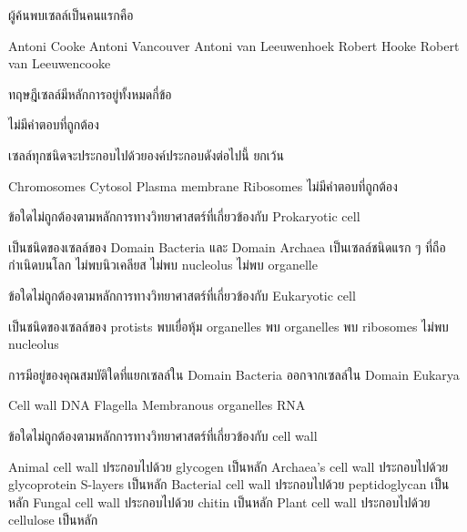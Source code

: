 \begin{questions}
\filbreak
  \question ผู้ค้นพบเซลล์เป็นคนแรกคือ
  \begin{choices}
    \choice Antoni Cooke
    \choice Antoni Vancouver
    \choice Antoni van Leeuwenhoek
    \choice Robert Hooke
    \choice Robert van Leeuwencooke
\end{choices}

\filbreak
  \question ทฤษฎีเซลล์มีหลักการอยู่ทั้งหมดกี่ข้อ
  \begin{choices}
    \choice ไม่มีคำตอบที่ถูกต้อง
\end{choices}

\filbreak
  \question เซลล์ทุกชนิดจะประกอบไปด้วยองค์ประกอบดังต่อไปนี้ ยกเว้น
  \begin{choices}
    \choice Chromosomes
    \choice Cytosol
    \choice Plasma membrane
    \choice Ribosomes
    \choice ไม่มีคำตอบที่ถูกต้อง
\end{choices}

\filbreak
  \question ข้อใดไม่ถูกต้องตามหลักการทางวิทยาศาสตร์ที่เกี่ยวข้องกับ Prokaryotic cell
  \begin{choices}
    \choice เป็นชนิดของเซลล์ของ Domain Bacteria และ Domain Archaea
    \choice เป็นเซลล์ชนิดแรก ๆ ที่ถือกำเนิดบนโลก
    \choice ไม่พบนิวเคลียส
    \choice ไม่พบ nucleolus
    \choice ไม่พบ organelle
\end{choices}

\filbreak
  \question ข้อใดไม่ถูกต้องตามหลักการทางวิทยาศาสตร์ที่เกี่ยวข้องกับ Eukaryotic cell
  \begin{choices}
    \choice เป็นชนิดของเซลล์ของ protists
    \choice พบเยื่อหุ้ม organelles
    \choice พบ organelles
    \choice พบ ribosomes
    \choice ไม่พบ nucleolus
\end{choices}

\filbreak
  \question การมีอยู่ของคุณสมบัติใดที่แยกเซลล์ใน Domain Bacteria ออกจากเซลล์ใน Domain Eukarya
  \begin{choices}
    \choice Cell wall
    \choice DNA
    \choice Flagella
    \choice Membranous organelles
    \choice RNA
\end{choices}

\filbreak
  \question ข้อใดไม่ถูกต้องตามหลักการทางวิทยาศาสตร์ที่เกี่ยวข้องกับ cell wall
  \begin{choices}
    \choice Animal cell wall ประกอบไปด้วย glycogen เป็นหลัก
    \choice Archaea's cell wall ประกอบไปด้วย glycoprotein S-layers เป็นหลัก
    \choice Bacterial cell wall ประกอบไปด้วย peptidoglycan เป็นหลัก
    \choice Fungal cell wall ประกอบไปด้วย chitin เป็นหลัก
    \choice Plant cell wall ประกอบไปด้วย cellulose เป็นหลัก
\end{choices}


\end{questions}
